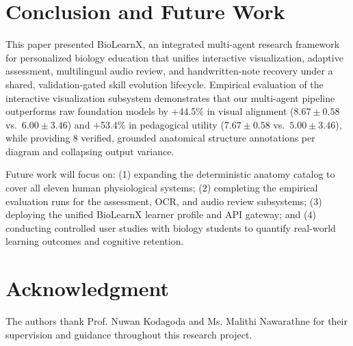 \documentclass[conference]{IEEEtran}
\begin{document}
\section{Conclusion and Future Work}
\label{sec:conclusion}

This paper presented BioLearnX, an integrated multi-agent research framework for personalized biology education that unifies interactive visualization, adaptive assessment, multilingual audio review, and handwritten-note recovery under a shared, validation-gated skill evolution lifecycle. Empirical evaluation of the interactive visualization subsystem demonstrates that our multi-agent pipeline outperforms raw foundation models by +44.5\% in visual alignment ($8.67 \pm 0.58$ vs.\ $6.00 \pm 3.46$) and +53.4\% in pedagogical utility ($7.67 \pm 0.58$ vs.\ $5.00 \pm 3.46$), while providing 8 verified, grounded anatomical structure annotations per diagram and collapsing output variance.

Future work will focus on: (1) expanding the deterministic anatomy catalog to cover all eleven human physiological systems; (2) completing the empirical evaluation runs for the assessment, OCR, and audio review subsystems; (3) deploying the unified BioLearnX learner profile and API gateway; and (4) conducting controlled user studies with biology students to quantify real-world learning outcomes and cognitive retention.

\section*{Acknowledgment}

The authors thank Prof. Nuwan Kodagoda and Ms. Malithi Nawarathne for their supervision and guidance throughout this research project.
\end{document}
